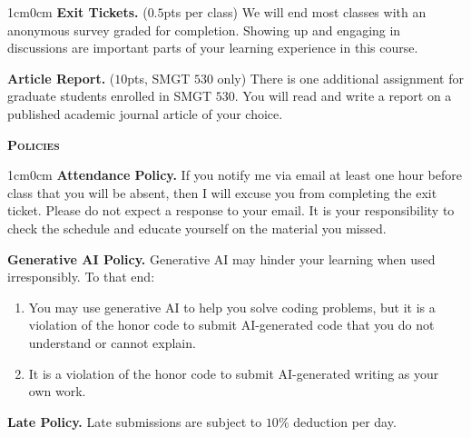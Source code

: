 \documentclass[11pt]{article}
\begin{document}
\begin{adjustwidth}{1cm}{0cm}
  \textbf{Exit Tickets.} ($0.5$pts per class) We will end most classes with an anonymous survey graded for completion. Showing up and engaging in discussions are important parts of your learning experience in this course.

  \textbf{Article Report.} ($10$pts, SMGT $530$ only) There is one additional assignment for graduate students enrolled in SMGT $530$. You will read and write a report on a published academic journal article of your choice.
\end{adjustwidth}

\textbf{\textsc{Policies}}
\begin{adjustwidth}{1cm}{0cm}
  \textbf{Attendance Policy.} If you notify me via email at least one hour before class that you will be absent, then I will excuse you from completing the exit ticket. Please do not expect a response to your email. It is your responsibility to check the schedule and educate yourself on the material you missed.

  \textbf{Generative AI Policy.} Generative AI may hinder your learning when used irresponsibly. To that end:
  \begin{enumerate}
    \item You may use generative AI to help you solve coding problems, but it is a violation of the honor code to submit AI-generated code that you do not understand or cannot explain.
    \item It is a violation of the honor code to submit AI-generated writing as your own work.
  \end{enumerate}

  \textbf{Late Policy.} Late submissions are subject to $10\%$ deduction per day.
\end{adjustwidth}
\end{document}
